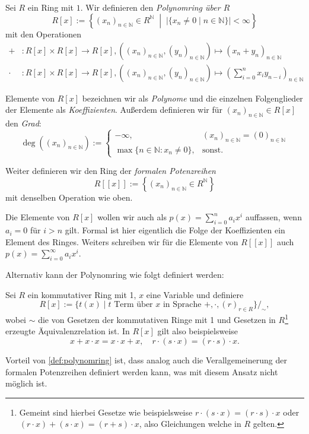 \begin{definition}\label{def:polynomring}
    Sei $R$ ein Ring mit $1$. Wir definieren den \emph{Polynomring über $R$}
    $$R[x]:=\left\{(x_n)_{n\in \mathbb{N}} \in R^\mathbb{N} \;\middle|\; \vert\{x_n\neq 0\mid n\in \mathbb{N}\}\vert<\infty\right\}$$
    mit den Operationen
    \begin{align*}
        + &: R[x] \times R[x] \to R[x], ((x_n)_{n\in \mathbb{N}}, (y_n)_{n\in\mathbb{N}}) \mapsto (x_n+y_n)_{n\in\mathbb{N}}\\
        \cdot &: R[x] \times R[x] \to R[x], ((x_n)_{n\in \mathbb{N}}, (y_n)_{n\in\mathbb{N}}) \mapsto \left(\sum_{i=0}^n x_i y_{n-i}\right)_{n\in\mathbb{N}}
    \end{align*}

    Elemente von $R[x]$ bezeichnen wir als \emph{Polynome} und die einzelnen Folgenglieder der Elemente als \emph{Koeffizienten}. Außerdem definieren wir für $(x_n)_{n\in\mathbb{N}}\in R[x]$ den \emph{Grad}:
    $$\deg ((x_n)_{n\in\mathbb{N}}):=
    \begin{cases}
        -\infty, & (x_n)_{n\in\mathbb{N}}=(0)_{n\in\mathbb{N}}\\
        \max\{n\in\mathbb{N}:x_n\neq 0\}, & \text{sonst.}
    \end{cases}$$

    Weiter definieren wir den Ring der \emph{formalen Potenzreihen} 
    $$R[[x]]:=\left\{(x_n)_{n \in \mathbb{N}} \in R^\mathbb{N}\right\}$$
    mit denselben Operation wie oben. 
    
    Die Elemente von $R[x]$ wollen wir auch als $p(x)=\sum_{i=0}^na_ix^i$ auffassen, wenn $a_i=0$ für $i>n$ gilt. Formal ist hier eigentlich die Folge
    der Koeffizienten ein Element des Ringes. Weiters schreiben wir für die Elemente von $R[[x]]$ auch
    $p(x)=\sum_{i=0}^\infty a_ix^i$.
\end{definition}

\begin{remark}
    Alternativ kann der Polynomring wie folgt definiert werden:

    Sei $R$ ein kommutativer Ring mit 1, $x$ eine Variable und definiere
    $$ R[x] := \{ t(x) \mid t \text{ Term über $x$ in Sprache } +, \cdot, (r)_{r \in R} \}/_\sim, $$
    wobei $\sim$ die von Gesetzen der kommutativen Ringe mit 1 und Gesetzen in $R$\footnote{Gemeint sind hierbei Gesetze wie beispielsweise $r\cdot(s\cdot x)=(r\cdot s)\cdot x$ oder $(r\cdot x)+(s\cdot x)=(r+s)\cdot x$, also Gleichungen welche in $R$ gelten.} erzeugte Äquivalenz\-relation ist. In $R[x]$ gilt also beispielsweise
    $$ x + x \cdot x = x \cdot x + x, \quad r \cdot (s \cdot x) = (r \cdot s) \cdot x. $$

    Vorteil von \cref{def:polynomring} ist, dass analog auch die Verallgemeinerung der formalen Potenzreihen definiert werden kann, was mit diesem Ansatz nicht möglich ist.
\end{remark}


